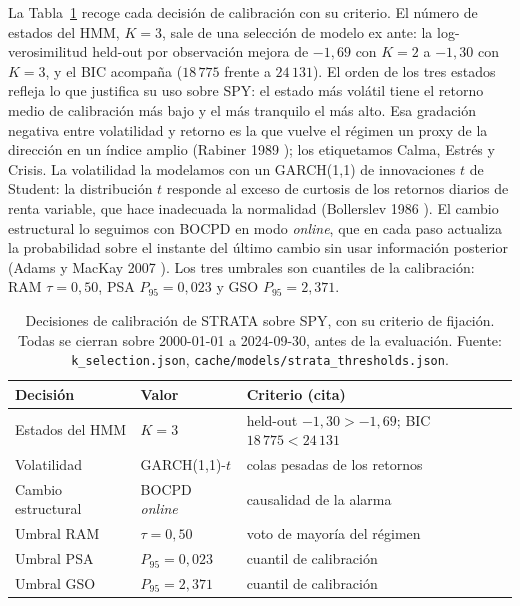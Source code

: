 La Tabla~\ref{tab:mp-calib} recoge cada decisión de calibración con su criterio. El número de estados del HMM, $K = 3$, sale de una selección de modelo ex ante: la log-verosimilitud held-out por observación mejora de $-1{,}69$ con $K = 2$ a $-1{,}30$ con $K = 3$, y el BIC acompaña ($18\,775$ frente a $24\,131$). El orden de los tres estados refleja lo que justifica su uso sobre SPY: el estado más volátil tiene el retorno medio de calibración más bajo y el más tranquilo el más alto. Esa gradación negativa entre volatilidad y retorno es la que vuelve el régimen un proxy de la dirección en un índice amplio (Rabiner 1989 \cite{rabiner1989}); los etiquetamos Calma, Estrés y Crisis. La volatilidad la modelamos con un GARCH(1,1) de innovaciones $t$ de Student: la distribución $t$ responde al exceso de curtosis de los retornos diarios de renta variable, que hace inadecuada la normalidad (Bollerslev 1986 \cite{bollerslev1986}). El cambio estructural lo seguimos con BOCPD en modo \emph{online}, que en cada paso actualiza la probabilidad sobre el instante del último cambio sin usar información posterior (Adams y MacKay 2007 \cite{adams2007}). Los tres umbrales son cuantiles de la calibración: RAM $\tau = 0{,}50$, PSA $P_{95} = 0{,}023$ y GSO $P_{95} = 2{,}371$.

\begin{table}[htbp]
\centering
\caption{Decisiones de calibración de STRATA sobre SPY, con su criterio de fijación. Todas se cierran sobre 2000-01-01 a 2024-09-30, antes de la evaluación. Fuente: \texttt{k\_selection.json}, \texttt{cache/models/strata\_thresholds.json}.}
\label{tab:mp-calib}
\begin{tabular}{lll}
\toprule
Decisión & Valor & Criterio (cita) \\
\midrule
Estados del HMM & $K = 3$ & held-out $-1{,}30 > -1{,}69$; BIC $18\,775 < 24\,131$ \cite{rabiner1989} \\
Volatilidad & GARCH(1,1)-$t$ & colas pesadas de los retornos \cite{bollerslev1986} \\
Cambio estructural & BOCPD \emph{online} & causalidad de la alarma \cite{adams2007} \\
Umbral RAM & $\tau = 0{,}50$ & voto de mayoría del régimen \\
Umbral PSA & $P_{95} = 0{,}023$ & cuantil de calibración \\
Umbral GSO & $P_{95} = 2{,}371$ & cuantil de calibración \\
\bottomrule
\end{tabular}
\end{table}

